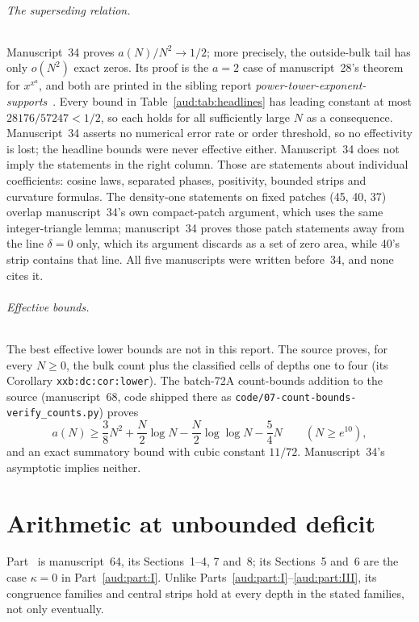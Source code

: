 \documentclass[11pt,a4paper]{article}
\numberwithin{equation}{section}
\begin{document}
\paragraph{The superseding relation.}
Manuscript~34 proves $a(N)/N^2\to1/2$; more precisely, the outside-bulk tail has only $o(N^2)$ exact zeros. Its proof is the $a=2$ case of manuscript~28's theorem for $x^{x^a}$, and both are printed in the sibling report \emph{power-tower-exponent-supports}~\cite{pte}. Every bound in Table~\ref{aud:tab:headlines} has leading constant at most $28176/57247<1/2$, so each holds for all sufficiently large $N$ as a consequence. Manuscript~34 asserts no numerical error rate or order threshold, so no effectivity is lost; the headline bounds were never effective either. Manuscript~34 does not imply the statements in the right column. Those are statements about individual coefficients: cosine laws, separated phases, positivity, bounded strips and curvature formulas. The density-one statements on fixed patches (45, 40, 37) overlap manuscript~34's own compact-patch argument, which uses the same integer-triangle lemma; manuscript~34 proves those patch statements away from the line $\delta=0$ only, which its argument discards as a set of zero area, while 40's strip contains that line. All five manuscripts were written before~34, and none cites it.

\paragraph{Effective bounds.}
The best effective lower bounds are not in this report. The source proves, for every $N\ge0$, the bulk count plus the classified cells of depths one to four (its Corollary \texttt{xxb:dc:cor:lower}). The batch-72A count-bounds addition to the source (manuscript~68, code shipped there as \nolinkurl{code/07-count-bounds-verify_counts.py}) proves
\[
 a(N)\ge\frac38N^2+\frac N2\log N-\frac N2\log\log N-\frac54N\qquad(N\ge e^{10}),
\]
and an exact summatory bound with cubic constant $11/72$. Manuscript~34's asymptotic implies neither.

\part{Arithmetic at unbounded deficit}\label{aud:part:IV}
Part~\ref{aud:part:IV} is manuscript~64, its Sections~1--4, 7 and~8; its Sections~5 and~6 are the case $\kappa=0$ in Part~\ref{aud:part:I}. Unlike Parts~\ref{aud:part:I}--\ref{aud:part:III}, its congruence families and central strips hold at every depth in the stated families, not only eventually.
\end{document}
